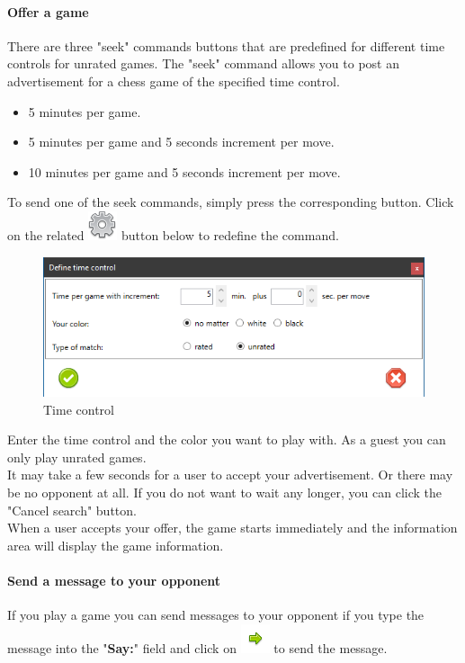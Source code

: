 \documentclass[11pt,a4paper]{article}
\begin{document}
\paragraph{Offer a game}
There are three "seek" commands buttons that are predefined for different time controls for unrated games. The "seek" command allows you to post an advertisement for a chess 
game of the specified time control.

\begin{itemize}
	\item 5 minutes per game.
	\item 5 minutes per game and 5 seconds increment per move.
	\item 10 minutes per game and 5 seconds increment per move.
\end{itemize}
To send one of the seek commands, simply press the corresponding button.
Click on the related \includegraphics[scale=0.3]{cog.png} button below to redefine the command.
\begin{figure}[H]
	\centering
	\includegraphics[scale=1.0]{fics4.png}
	\caption{Time control}
	\label{fig:ficsTimecontrol}
\end{figure}
Enter the time control and the color you want to play with. As a guest you can only play unrated games.\\
It may take a few seconds for a user to accept your advertisement. Or there may be no opponent at all. If you do not want to wait any longer, you can click the "Cancel search" button.\\
When a user accepts your offer, the game starts immediately and the information area will display the game information.

\paragraph{Send a message to your opponent}
If you play a game you can send messages to your opponent if you type the message into the "\textbf{Say:}" field and click on \includegraphics[scale=0.5]{bullet_go.png} to send the message.\\
\end{document}
